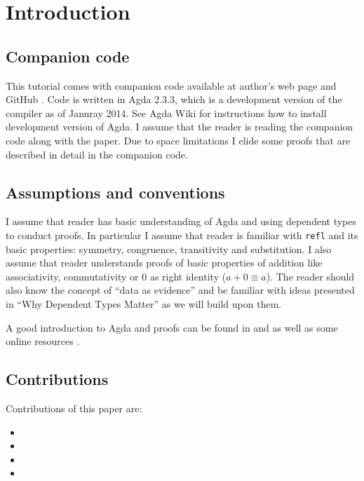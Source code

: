 \section{Introduction}

\subsection{Companion code}

This tutorial comes with companion code available at author's web page and GitHub \cite{js-github}. Code is written in Agda 2.3.3, which is a development version of the compiler as of Januray 2014. See Agda Wiki for instructions how to install development version of Agda. I assume that the reader is reading the companion code along with the paper. Due to space limitations I elide some proofs that are described in detail in the companion code.

\subsection{Assumptions and conventions}

I assume that reader has basic understanding of Agda and using dependent types to conduct proofs. In particular I assume that reader is familiar with \texttt{refl} and its basic properties: symmetry, congruence, transitivity and substitution. I also assume that reader understands proofs of basic properties of addition like associativity, commutativity or 0 as right identity ($a + 0 ≡ a$). The reader should also know the concept of ``data as evidence'' and be familiar with ideas presented in ``Why Dependent Types Matter'' \cite{AltMcBMcK05} as we will build upon them.

A good introduction to Agda and proofs can be found in and  as well as some online resources .


\subsection{Contributions}

Contributions of this paper are:

\begin{itemize}
 \item %
 \item %
 \item %
 \item %
\end{itemize}


